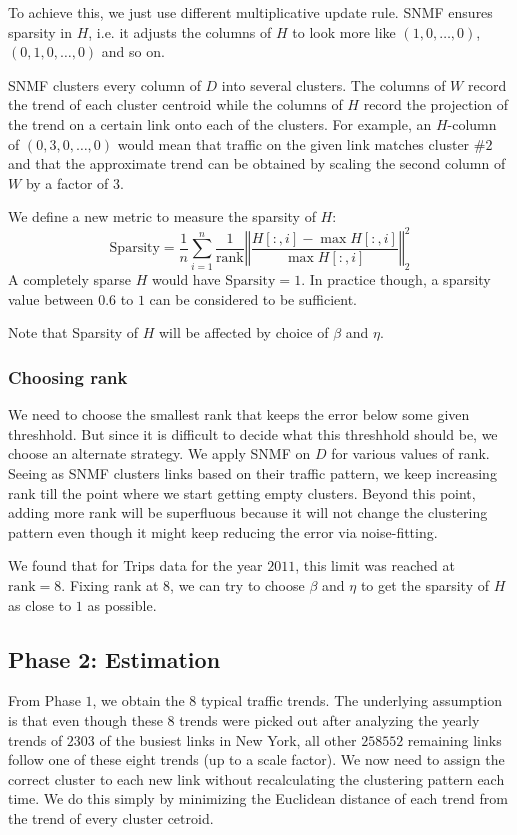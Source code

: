 \documentclass[10pt,a4paper]{amsart}
\begin{document}
To achieve this, we just use different multiplicative update rule. SNMF ensures
sparsity in \(H\), i.e. it adjusts the columns of \(H\) to look more like
\(\left(1,0,\ldots,0\right)\), \(\left(0,1,0,\ldots,0\right)\) and so on.

SNMF clusters every column of \(D\) into several clusters. The columns of
\(W\) record the trend of each cluster centroid while the columns of \(H\)
record the projection of the trend on a certain link onto each of the
clusters. For example, an \(H\)-column of \(\left(0,3,0,\ldots,0\right)\)
would mean that traffic on the given link matches cluster \(\#2\) and that the
approximate trend can be obtained by scaling the second column of \(W\) by a
factor of \(3\).

We define a new metric to measure the sparsity of \(H\):
	\[\text{Sparsity} = \frac{1}{n}\sum_{i=1}^{n}\frac{1}{\text{rank}}\left
	\Vert\dfrac{H[:,i]-\max H[:,i]}{\max H[:,i]}\right\Vert_2^2\]
A completely sparse \(H\) would have \(\text{Sparsity} = 1\). In practice
though, a sparsity value between \(0.6\) to \(1\) can be considered to be
sufficient.

Note that Sparsity of \(H\) will be affected by choice of \(\beta\) and
\(\eta\).

\subsubsection{Choosing rank}
We need to choose the smallest rank that keeps the error below some given
threshhold. But since it is difficult to decide what this threshhold should
be, we choose an alternate strategy. We apply SNMF on \(D\) for various values
of rank. Seeing as SNMF clusters links based on their traffic pattern, we keep
increasing rank till the point where we start getting empty clusters. Beyond
this point, adding more rank will be superfluous because it will not change
the clustering pattern even though it might keep reducing the error via
noise-fitting.

We found that for Trips data for the year \(2011\), this limit was reached at
\(\text{rank} = 8\). Fixing rank at \(8\), we can try to choose \(\beta\) and
\(\eta\) to get the sparsity of \(H\) as close to \(1\) as possible.

\subsection{Phase 2: Estimation}
From Phase \(1\), we obtain the \(8\) typical traffic trends. The underlying
assumption is that even though these \(8\) trends were picked out after
analyzing the yearly trends of \(2303\) of the busiest links in New York, all
other \(258552\) remaining links follow one of these eight trends (up to a
scale factor). We now need to assign the correct cluster to each new link
without recalculating the clustering pattern each time. We do this simply by
minimizing the Euclidean distance of each trend from the trend of every
cluster cetroid.
\end{document}
